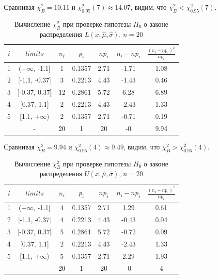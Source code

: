 \noindent Сравнивая $\chi^{2}_{B} = 10.11$ и $\chi^{2}_{0.95}(7) \approx 14.07$, видим, что $\chi^{2}_{B} < \chi^{2}_{0.95}(7)$.
\\

\begin{table}[H]
	\centering
	\begin{tabular}{| c | c | c | c | c | c | c |}
		\hline
		$i$ & $limits$         &   $n_i$ &    $p_i$ &   $np_i$ &   $n_i - np_i$ &   $\frac{(n_i-np_i)^2}{np_i}$ \\
		\hline
		1 & ($-\infty$, -1.1] &     1 & 0.1357 &   2.71 &        -1.71 &                        1.08 \\
		2 & [-1.1, -0.37]  &     3 & 0.2213 &   4.43 &        -1.43 &                        0.46 \\
		3 & [-0.37, 0.37]  &    12 & 0.2861 &   5.72 &         6.28 &                        6.89 \\
		4 & [0.37, 1.1]    &     2 & 0.2213 &   4.43 &        -2.43 &                        1.33 \\
		5 & [1.1, $+\infty$)   &     2 & 0.1357 &   2.71 &        -0.71 &                        0.19 \\
		\sum & -              &    20 & 1      &  20    &        -0    &                        9.94 \\
		\hline
	\end{tabular}
	\caption{ Вычисление $\chi^{2}_{B}$ при проверке гипотезы $H_{0}$ о законе распределения $L(x,\hat{\mu}, \hat{\sigma})$, $n=20$}
	\label{tab:laplace_chi_2}
\end{table}
\noindent Сравнивая $\chi^{2}_{B} = 9.94$ и $\chi^{2}_{0.95}(4) \approx 9.49$, видим, что $\chi^{2}_{B} > \chi^{2}_{0.95}(4)$.

\begin{table}[H]
	\centering
	\begin{tabular}{| c | c | c | c | c | c | c |}
		\hline
		$i$ & $limits$         &   $n_i$ &    $p_i$ &   $np_i$ &   $n_i - np_i$ &   $\frac{(n_i-np_i)^2}{np_i}$ \\
		\hline
		1 & ($-\infty$, -1.1] &     4 & 0.1357 &   2.71 &         1.29 &                        0.61 \\
		2 & [-1.1, -0.37]  &     4 & 0.2213 &   4.43 &        -0.43 &                        0.04 \\
		3 & [-0.37, 0.37]  &     5 & 0.2861 &   5.72 &        -0.72 &                        0.09 \\
		4 & [0.37, 1.1]    &     2 & 0.2213 &   4.43 &        -2.43 &                        1.33 \\
		5 & [1.1, $+\infty$)   &     5 & 0.1357 &   2.71 &         2.29 &                        1.93 \\
		\sum & -              &    20 & 1      &  20    &        -0    &                        4    \\
		\hline
	\end{tabular}
	\caption{ Вычисление $\chi^{2}_{B}$ при проверке гипотезы $H_{0}$ о законе распределения $U(x,\hat{\mu}, \hat{\sigma})$, $n=20$}
	\label{tab:uniform_chi_2}
\end{table}

